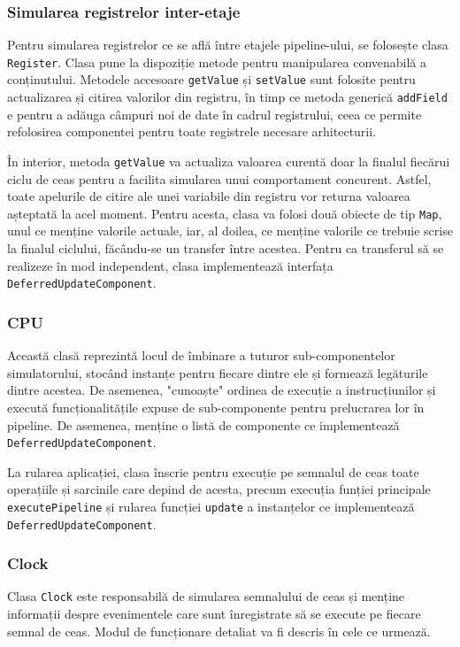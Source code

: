 \documentclass{article}
\begin{document}
\subsubsection{Simularea registrelor inter-etaje}
Pentru simularea registrelor ce se află între etajele pipeline-ului, se folosește clasa \texttt{Register}. Clasa pune la dispoziție metode pentru manipularea convenabilă a conținutului. Metodele accesoare \texttt{getValue} și \texttt{setValue} sunt folosite pentru actualizarea și citirea valorilor din registru, în timp ce metoda generică \texttt{addField} e pentru a adăuga câmpuri noi de date în cadrul registrului, ceea ce permite refolosirea componentei pentru toate registrele necesare arhitecturii.

În interior, metoda \texttt{getValue} va actualiza valoarea curentă doar la finalul fiecărui ciclu de ceas pentru a facilita simularea unui comportament concurent. Astfel, toate apelurile de citire ale unei variabile din registru vor returna valoarea așteptată la acel moment. Pentru acesta, clasa va folosi două obiecte de tip \texttt{Map}, unul ce menține valorile actuale, iar, al doilea, ce menține valorile ce trebuie scrise la finalul ciclului, făcându-se un transfer între acestea. Pentru ca transferul să se realizeze în mod independent, clasa implementează interfața \texttt{DeferredUpdateComponent}. 



\subsubsection{CPU}
Această clasă reprezintă locul de îmbinare a tuturor sub-componentelor simulatorului, stocând instanțe pentru fiecare dintre ele și formează legăturile dintre acestea. De asemenea, "cunoaște" ordinea de execuție a instrucțiunilor și execută funcționalitățile expuse de sub-componente pentru prelucrarea lor în pipeline. De asemenea, menține o listă de componente ce implementează \texttt{DeferredUpdateComponent}.


La rularea aplicației, clasa înscrie pentru execuție pe semnalul de ceas toate operațiile și sarcinile care depind de acesta, precum execuția funției principale \texttt{executePipeline} și rularea funcției \texttt{update} a instanțelor ce implementează \texttt{DeferredUpdateComponent}. 

\subsubsection{Clock}
Clasa \texttt{Clock} este responsabilă de simularea semnalului de ceas și menține informații despre evenimentele care sunt înregistrate să se execute pe fiecare semnal de ceas. Modul de funcționare detaliat va fi descris în cele ce urmează.
\end{document}
